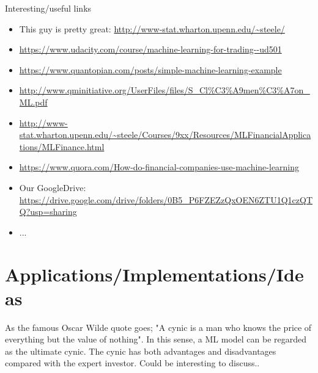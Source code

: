 \documentclass[12pt, oneside]{article}
\begin{document}
Interesting/useful links
\begin{itemize}
\item This guy is pretty great: \url{http://www-stat.wharton.upenn.edu/~steele/}
\item \url{https://www.udacity.com/course/machine-learning-for-trading--ud501}
\item \url{https://www.quantopian.com/posts/simple-machine-learning-example}
\item \url{http://www.qminitiative.org/UserFiles/files/S_Cl\%C3\%A9men\%C3\%A7on_ML.pdf}
\item \url{http://www-stat.wharton.upenn.edu/~steele/Courses/9xx/Resources/MLFinancialApplications/MLFinance.html}
\item \url{https://www.quora.com/How-do-financial-companies-use-machine-learning}
\item Our GoogleDrive: \url{https://drive.google.com/drive/folders/0B5_P6FZEZzQxOEN6ZTU1Q1czQTQ?usp=sharing}

\item ...

\end{itemize}

\section{Applications/Implementations/Ideas}

As the famous Oscar Wilde quote goes; "A cynic is a man who knows the price of everything but the value of nothing". In this sense, a ML model can be regarded as the ultimate cynic. The cynic has both advantages and disadvantages compared with the expert investor. Could be interesting to discuss..
\end{document}
